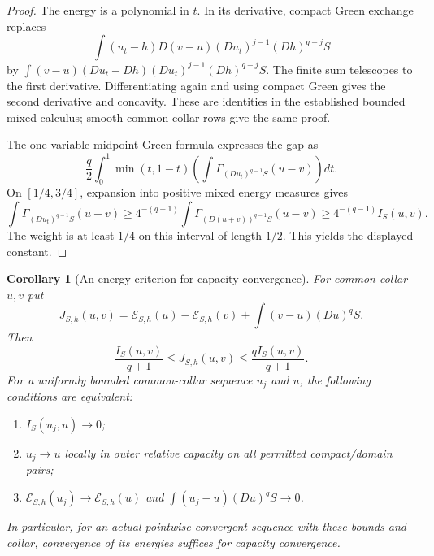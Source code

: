 \documentclass[11pt,a4paper]{article}
\numberwithin{equation}{section}
\newtheorem{corollary}[theorem]{Corollary}
\theoremstyle{definition}
\theoremstyle{remark}
\begin{document}
\begin{proof}
The energy is a polynomial in $t$. In its derivative, compact
Green exchange replaces
\[
 \int(u_t-h)D(v-u)(Du_t)^{j-1}(Dh)^{q-j}S
\]
by
$\int(v-u)(Du_t-Dh)(Du_t)^{j-1}(Dh)^{q-j}S$.
The finite sum telescopes to the first derivative. Differentiating
again and using compact Green gives the second derivative and
concavity. These are identities in the established bounded
mixed calculus; smooth common-collar rows give the same proof.

The one-variable midpoint Green formula expresses the gap as
\[
 \frac q2\int_0^1\min(t,1-t)
       \left(\int\Gamma_{(Du_t)^{q-1}S}(u-v)\right)dt.
\]
On $[1/4,3/4]$, expansion into positive mixed energy measures gives
\[
 \int\Gamma_{(Du_t)^{q-1}S}(u-v)
 \geq4^{-(q-1)}\int\Gamma_{(D(u+v))^{q-1}S}(u-v)
 \geq4^{-(q-1)}I_S(u,v).
\]
The weight is at least $1/4$ on this interval of length $1/2$.
This yields the displayed constant.
\end{proof}

\begin{corollary}[An energy criterion for capacity convergence]
\label{cor:r3-energy-capacity-topology}
For common-collar $u,v$ put
\[
 J_{S,h}(u,v)=\mathcal E_{S,h}(u)-\mathcal E_{S,h}(v)
                 +\int(v-u)(Du)^qS.
\]
Then
\[
 \frac{I_S(u,v)}{q+1}
       \leq J_{S,h}(u,v)
       \leq\frac{qI_S(u,v)}{q+1}.
\]
For a uniformly bounded common-collar sequence $u_j$ and $u$,
the following conditions are equivalent:
\begin{enumerate}
\item $I_S(u_j,u)\to0$;
\item $u_j\to u$ locally in outer relative capacity on all
      permitted compact/domain pairs;
\item $\mathcal E_{S,h}(u_j)\to\mathcal E_{S,h}(u)$ and
      $\int(u_j-u)(Du)^qS\to0$.
\end{enumerate}
In particular, for an actual pointwise convergent sequence with
these bounds and collar, convergence of its energies suffices
for capacity convergence.
\end{corollary}
\end{document}

